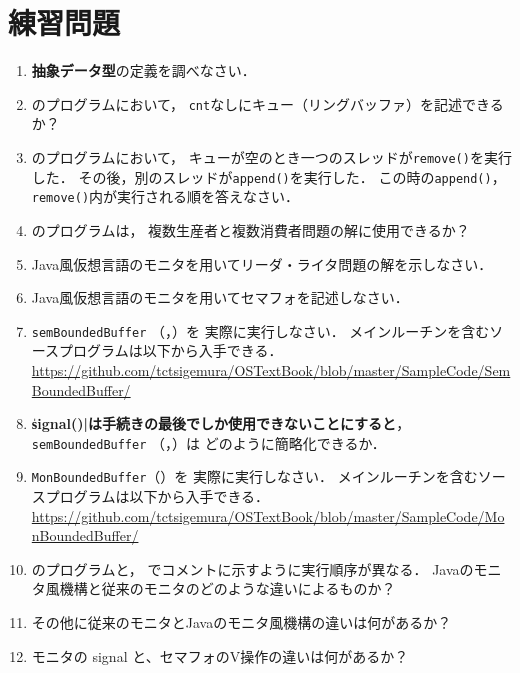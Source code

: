 \section*{練習問題}
\begin{enumerate}
\renewcommand{\labelenumi}{\tt \arabic{chapter}.\arabic{enumi}}
 \setlength{\leftskip}{1em}

\item {\bf 抽象データ型}の定義を調べなさい．

\item {}のプログラムにおいて，
{\tt cnt}なしにキュー（リングバッファ）を記述できるか？

\item {}のプログラムにおいて，
キューが空のとき一つのスレッドが{\tt remove()}を実行した．
その後，別のスレッドが{\tt append()}を実行した．
この時の{\tt append()}，{\tt remove()}内が実行される順を答えなさい．

\item {}のプログラムは，
複数生産者と複数消費者問題の解に使用できるか？

\item Java風仮想言語のモニタを用いてリーダ・ライタ問題の解を示しなさい．

\item Java風仮想言語のモニタを用いてセマフォを記述しなさい．

\item {\tt semBoundedBuffer}
（，）を
実際に実行しなさい．
メインルーチンを含むソースプログラムは以下から入手できる． \\
\url{https://github.com/tctsigemura/OSTextBook/blob/master/SampleCode/SemBoundedBuffer/}

\item {\bf \|signal()|は手続きの最後でしか使用できないことにすると}，
{\tt semBoundedBuffer}
（，）は
どのように簡略化できるか．

\item {\tt MonBoundedBuffer}（）を
実際に実行しなさい．
メインルーチンを含むソースプログラムは以下から入手できる．\\
\url{https://github.com/tctsigemura/OSTextBook/blob/master/SampleCode/MonBoundedBuffer/}

\item {}のプログラムと，
でコメントに示すように実行順序が異なる．
Javaのモニタ風機構と従来のモニタのどのような違いによるものか？

\item その他に従来のモニタとJavaのモニタ風機構の違いは何があるか？

\item モニタの signal と、セマフォのV操作の違いは何があるか？
\end{enumerate}
